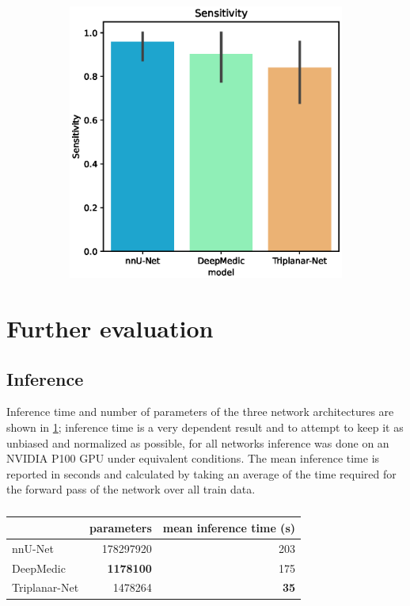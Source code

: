 \begin{figure}
	\ContinuedFloat
	\centering
	\begin{subfigure}{.6\linewidth}
		\includegraphics[width=\linewidth]{figures/Sensitivity.eps}
	\end{subfigure}
	\caption[]{}
	\label{fig:results_cont_cont}
\end{figure}

\section{Further evaluation}

\subsection{Inference}
Inference time and number of parameters of the three network architectures are shown in \ref{table:inference}; inference time is a very dependent result and to attempt to keep it as unbiased and normalized as possible, for all networks inference was done on an NVIDIA P100 GPU under equivalent conditions. The mean inference time is reported in seconds and calculated by taking an average of the time required for the forward pass of the network over all train data.

\begin{table}[h]
	\centering
	\begin{tabular}{l r r }
		& parameters & mean inference time (s) \\
		\hline
		nnU-Net & 178297920 & 203 \\
		DeepMedic & \textbf{1178100} & 175 \\
		Triplanar-Net & 1478264 & \textbf{35} \\
	\end{tabular}
	\caption{}
	\label{table:inference}
\end{table}

